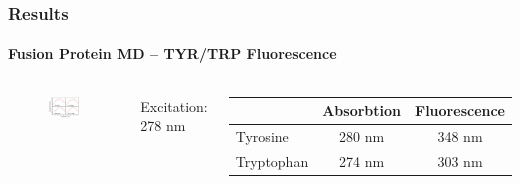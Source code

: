 \documentclass[english]{beamer}
\begin{document}
\begin{frame}
    \frametitle{Results}
    \framesubtitle{Fusion Protein MD -- TYR/TRP Fluorescence}  

    \vspace{-4ex}

    \begin{columns}[t]
        \begin{figure}
            \includegraphics[width=1.0\textwidth]{figures/TyrTrp/TyrTrp_experiment.pdf}
        \end{figure}         

        \centering
        Excitation: 278 nm 

        \begin{center}
        \begin{table}
        \tiny
        \begin{tabular}{l c c} 
                       & Absorbtion & Fluorescence \\
            \hline
            Tyrosine   & 280 nm & 348 nm \\
            Tryptophan & 274 nm & 303 nm \\
        \end{tabular}
        \end{table}
        \end{center}


\end{columns}
\end{frame}
\end{document}
